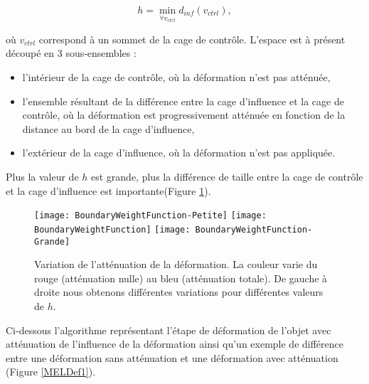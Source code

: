 \begin{equation}
  h = \min_{\forall v_{ctrl}} d_{inf}(v_{ctrl}),
\end{equation}

où $v_{ctrl}$ correspond à un sommet de la cage de contrôle. L'espace est à
présent découpé en 3 sous-ensembles : 

\begin{itemize}

\item l'intérieur de la cage de contrôle, où la déformation n'est pas atténuée,

\item l'ensemble résultant de la différence entre la cage d'influence et la cage
de contrôle, où la déformation est progressivement atténuée en fonction de la
distance au bord de la cage d'influence,

\item l'extérieur de la cage d'influence, où la déformation n'est pas
appliquée.

\end{itemize}

Plus la valeur de $h$ est grande, plus la différence de taille entre la cage
de contrôle et la cage d'influence est importante(Figure \ref{MELBou}).

\begin{figure}[!ht]
    \texttt{[image: BoundaryWeightFunction-Petite]}
    \texttt{[image: BoundaryWeightFunction]}
    \texttt{[image: BoundaryWeightFunction-Grande]}

    \caption[Variation de l'atténuation de la déformation] {Variation de
l'atténuation de la déformation. La couleur varie du rouge (atténuation nulle)
au bleu (atténuation totale). De gauche à droite nous obtenons différentes
variations pour différentes valeurs de $h$.}

    \label{MELBou}
\end{figure}

Ci-dessous l'algorithme représentant l'étape de déformation de l'objet avec
atténuation de l'influence de la déformation ainsi qu'un exemple de différence
entre une déformation sans atténuation et une déformation avec atténuation
(Figure \ref{MELDef1}). \\


